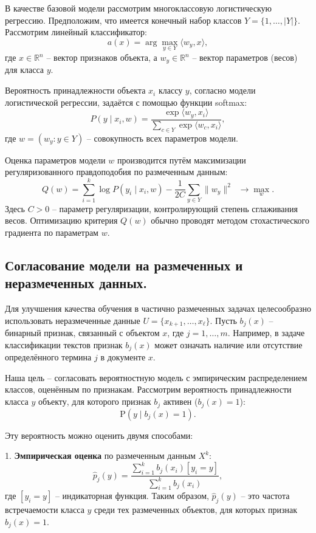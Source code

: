 В качестве базовой модели рассмотрим многоклассовую логистическую регрессию. Предположим, что имеется конечный набор классов $Y = \{1, \ldots, |Y|\}$. Рассмотрим линейный классификатор:
\[
    a(x) = \arg \max_{y \in Y} \langle w_y, x \rangle,
\]
где $x \in \mathbb{R}^n$ – вектор признаков объекта, а $w_y \in \mathbb{R}^n$ – вектор параметров (весов) для класса $y$.

Вероятность принадлежности объекта $x_i$ классу $y$, согласно модели логистической регрессии, задаётся с помощью функции softmax:
\[
    P(y \mid x_i, w) = \frac{\exp\langle w_y, x_i \rangle}{\sum_{c \in Y} \exp\langle w_c, x_i \rangle},
\]
где $w = (w_y: y \in Y)$ – совокупность всех параметров модели.

Оценка параметров модели $w$ производится путём максимизации регуляризованного правдоподобия по размеченным данным:
\[
    Q(w) = \sum_{i=1}^k \log P(y_i \mid x_i, w) - \frac{1}{2C}\sum_{y \in Y}\|w_y\|^2 \;\; \to \max_w.
\]
Здесь $C > 0$ – параметр регуляризации, контролирующий степень сглаживания весов. Оптимизацию критерия $Q(w)$ обычно проводят методом стохастического градиента по параметрам $w$.

\subsection{Согласование модели на размеченных и неразмеченных данных.}

Для улучшения качества обучения в частично размеченных задачах целесообразно использовать неразмеченные данные $U = \{x_{k+1}, \ldots, x_{\ell}\}$. Пусть $b_j(x)$ – бинарный признак, связанный с объектом $x$, где $j = 1, \ldots, m$. Например, в задаче классификации текстов признак $b_j(x)$ может означать наличие или отсутствие определённого термина $j$ в документе $x$.

Наша цель – согласовать вероятностную модель с эмпирическим распределением классов, оценённым по признакам. Рассмотрим вероятность принадлежности класса $y$ объекту, для которого признак $b_j$ активен ($b_j(x)=1$):
\[
    \mathrm{P}(y \mid b_j(x)=1).
\]

Эту вероятность можно оценить двумя способами:

1. \textbf{Эмпирическая оценка} по размеченным данным $X^k$:
\[
    \hat{p}_j(y) = \frac{\sum_{i=1}^k b_j(x_i)[y_i = y]}{\sum_{i=1}^k b_j(x_i)},
\]
где $[y_i = y]$ – индикаторная функция. Таким образом, $\hat{p}_j(y)$ – это частота встречаемости класса $y$ среди тех размеченных объектов, для которых признак $b_j(x)=1$.


